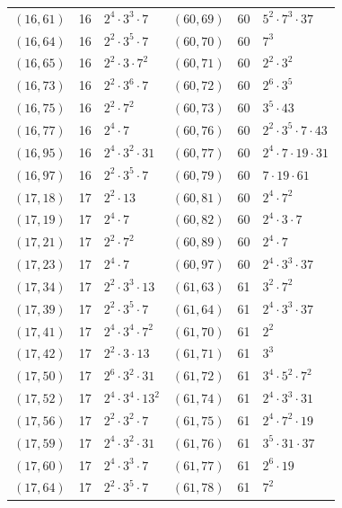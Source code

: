 \documentclass[11pt]{article}
\begin{document}
\begin{longtable}{@{}lrl@{\qquad}lrl@{}}
$(16,61)$ & 16 & $2^{4}\cdot 3^{3}\cdot 7$ & $(60,69)$ & 60 & $5^{2}\cdot 7^{3}\cdot 37$\\
$(16,64)$ & 16 & $2^{2}\cdot 3^{5}\cdot 7$ & $(60,70)$ & 60 & $7^{3}$\\
$(16,65)$ & 16 & $2^{2}\cdot 3\cdot 7^{2}$ & $(60,71)$ & 60 & $2^{2}\cdot 3^{2}$\\
$(16,73)$ & 16 & $2^{2}\cdot 3^{6}\cdot 7$ & $(60,72)$ & 60 & $2^{6}\cdot 3^{5}$\\
$(16,75)$ & 16 & $2^{2}\cdot 7^{2}$ & $(60,73)$ & 60 & $3^{5}\cdot 43$\\
$(16,77)$ & 16 & $2^{4}\cdot 7$ & $(60,76)$ & 60 & $2^{2}\cdot 3^{5}\cdot 7\cdot 43$\\
$(16,95)$ & 16 & $2^{4}\cdot 3^{2}\cdot 31$ & $(60,77)$ & 60 & $2^{4}\cdot 7\cdot 19\cdot 31$\\
$(16,97)$ & 16 & $2^{2}\cdot 3^{5}\cdot 7$ & $(60,79)$ & 60 & $7\cdot 19\cdot 61$\\
$(17,18)$ & 17 & $2^{2}\cdot 13$ & $(60,81)$ & 60 & $2^{4}\cdot 7^{2}$\\
$(17,19)$ & 17 & $2^{4}\cdot 7$ & $(60,82)$ & 60 & $2^{4}\cdot 3\cdot 7$\\
$(17,21)$ & 17 & $2^{2}\cdot 7^{2}$ & $(60,89)$ & 60 & $2^{4}\cdot 7$\\
$(17,23)$ & 17 & $2^{4}\cdot 7$ & $(60,97)$ & 60 & $2^{4}\cdot 3^{3}\cdot 37$\\
$(17,34)$ & 17 & $2^{2}\cdot 3^{3}\cdot 13$ & $(61,63)$ & 61 & $3^{2}\cdot 7^{2}$\\
$(17,39)$ & 17 & $2^{2}\cdot 3^{5}\cdot 7$ & $(61,64)$ & 61 & $2^{4}\cdot 3^{3}\cdot 37$\\
$(17,41)$ & 17 & $2^{4}\cdot 3^{4}\cdot 7^{2}$ & $(61,70)$ & 61 & $2^{2}$\\
$(17,42)$ & 17 & $2^{2}\cdot 3\cdot 13$ & $(61,71)$ & 61 & $3^{3}$\\
$(17,50)$ & 17 & $2^{6}\cdot 3^{2}\cdot 31$ & $(61,72)$ & 61 & $3^{4}\cdot 5^{2}\cdot 7^{2}$\\
$(17,52)$ & 17 & $2^{4}\cdot 3^{4}\cdot 13^{2}$ & $(61,74)$ & 61 & $2^{4}\cdot 3^{3}\cdot 31$\\
$(17,56)$ & 17 & $2^{2}\cdot 3^{2}\cdot 7$ & $(61,75)$ & 61 & $2^{4}\cdot 7^{2}\cdot 19$\\
$(17,59)$ & 17 & $2^{4}\cdot 3^{2}\cdot 31$ & $(61,76)$ & 61 & $3^{5}\cdot 31\cdot 37$\\
$(17,60)$ & 17 & $2^{4}\cdot 3^{3}\cdot 7$ & $(61,77)$ & 61 & $2^{6}\cdot 19$\\
$(17,64)$ & 17 & $2^{2}\cdot 3^{5}\cdot 7$ & $(61,78)$ & 61 & $7^{2}$\\

\end{longtable}
\end{document}
